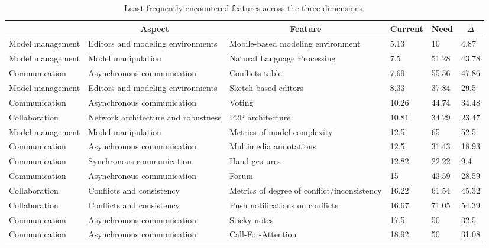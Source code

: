 
  \begin{table*}[]
  \centering
  \notsotiny
  \caption{ Least frequently encountered features across the three dimensions.}
\label{tab:least-frequent}
\begin{tabular}{|l|l|l|l|l|l|}
  \hline
  \rowcolor[HTML]{C0C0C0}
    \multicolumn{1}{|c|}{Dimension} & \multicolumn{1}{c|}{Aspect} & \multicolumn{1}{c|}{Feature} & \multicolumn{1}{c|}{Current} & \multicolumn{1}{c|}{Need} & \multicolumn{1}{c|}{$\Delta$} \\ \hline
    Model management & Editors and modeling environments & Mobile-based modeling environment & 5.13 & 10 & 4.87 \\ \hline 
Model management & Model manipulation & Natural Language Processing & 7.5 & 51.28 & 43.78 \\ \hline 
Communication & Asynchronous communication & Conflicts table & 7.69 & 55.56 & 47.86 \\ \hline 
Model management & Editors and modeling environments & Sketch-based editors & 8.33 & 37.84 & 29.5 \\ \hline 
Communication & Asynchronous communication & Voting & 10.26 & 44.74 & 34.48 \\ \hline 
Collaboration & Network architecture and robustness & P2P architecture & 10.81 & 34.29 & 23.47 \\ \hline 
Model management & Model manipulation & Metrics of model complexity & 12.5 & 65 & 52.5 \\ \hline 
Communication & Asynchronous communication & Multimedia annotations & 12.5 & 31.43 & 18.93 \\ \hline 
Communication & Synchronous communication & Hand gestures & 12.82 & 22.22 & 9.4 \\ \hline 
Communication & Asynchronous communication & Forum & 15 & 43.59 & 28.59 \\ \hline 
Collaboration & Conflicts and consistency & Metrics of degree of conflict/inconsistency & 16.22 & 61.54 & 45.32 \\ \hline 
Collaboration & Conflicts and consistency & Push notifications on conflicts & 16.67 & 71.05 & 54.39 \\ \hline 
Communication & Asynchronous communication & Sticky notes & 17.5 & 50 & 32.5 \\ \hline 
Communication & Asynchronous communication & Call-For-Attention & 18.92 & 50 & 31.08 \\ \hline 

\end{tabular}
\end{table*}
